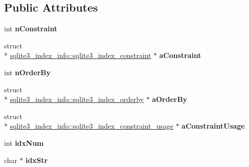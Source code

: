 \subsection*{Public Attributes}
\begin{DoxyCompactItemize}
\item 
\hypertarget{structsqlite3__index__info_ae861993a30ce914a5214eab2579d935a}{int {\bfseries n\+Constraint}}\label{structsqlite3__index__info_ae861993a30ce914a5214eab2579d935a}

\item 
\hypertarget{structsqlite3__index__info_a634aa93834e2b47acf34454746c0f248}{struct \\*
\hyperlink{structsqlite3__index__info_1_1sqlite3__index__constraint}{sqlite3\+\_\+index\+\_\+info\+::sqlite3\+\_\+index\+\_\+constraint} $\ast$ {\bfseries a\+Constraint}}\label{structsqlite3__index__info_a634aa93834e2b47acf34454746c0f248}

\item 
\hypertarget{structsqlite3__index__info_a3ef850fdc57eddbc8189fe84d0a9044e}{int {\bfseries n\+Order\+By}}\label{structsqlite3__index__info_a3ef850fdc57eddbc8189fe84d0a9044e}

\item 
\hypertarget{structsqlite3__index__info_a6823a68979e19d8e332389361e920ef9}{struct \\*
\hyperlink{structsqlite3__index__info_1_1sqlite3__index__orderby}{sqlite3\+\_\+index\+\_\+info\+::sqlite3\+\_\+index\+\_\+orderby} $\ast$ {\bfseries a\+Order\+By}}\label{structsqlite3__index__info_a6823a68979e19d8e332389361e920ef9}

\item 
\hypertarget{structsqlite3__index__info_a79b8a969dd7d582fc2ea3c0fbc5adb56}{struct \\*
\hyperlink{structsqlite3__index__info_1_1sqlite3__index__constraint__usage}{sqlite3\+\_\+index\+\_\+info\+::sqlite3\+\_\+index\+\_\+constraint\+\_\+usage} $\ast$ {\bfseries a\+Constraint\+Usage}}\label{structsqlite3__index__info_a79b8a969dd7d582fc2ea3c0fbc5adb56}

\item 
\hypertarget{structsqlite3__index__info_afcee17707a1c147fbd55c23c807fdae3}{int {\bfseries idx\+Num}}\label{structsqlite3__index__info_afcee17707a1c147fbd55c23c807fdae3}

\item 
\hypertarget{structsqlite3__index__info_ac63f4ebfe8d9331b040fa9e0e47c9d70}{char $\ast$ {\bfseries idx\+Str}}\label{structsqlite3__index__info_ac63f4ebfe8d9331b040fa9e0e47c9d70}


\end{DoxyCompactItemize}
